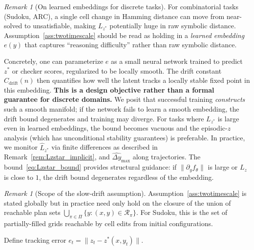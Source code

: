 \documentclass{article}
\theoremstyle{plain}
\theoremstyle{definition}
\theoremstyle{remark}
\newtheorem{remark}[theorem]{Remark}
\newcommand{\Cdrift}{C_{\mathrm{drift}}}
\begin{document}
\begin{remark}[On learned embeddings for discrete tasks]
\label{rem:reasoning_manifold}
For combinatorial tasks (Sudoku, ARC), a single cell change in Hamming distance can move from near-solved to unsatisfiable, making $L_{z^*}$ potentially huge in raw symbolic distance.
Assumption~\ref{ass:twotimescale} should be read as holding in a \emph{learned embedding} $e(y)$ that captures ``reasoning difficulty'' rather than raw symbolic distance.

Concretely, one can parameterize $e$ as a small neural network trained to predict $z^*$ or checker scores, regularized to be locally smooth.
The drift constant $\Cdrift(n)$ then quantifies how well the latent tracks a locally stable fixed point in this embedding.
\textbf{This is a design objective rather than a formal guarantee for discrete domains.}
We posit that successful training \emph{constructs} such a smooth manifold; if the network fails to learn a smooth embedding, the drift bound degenerates and training may diverge.
For tasks where $L_{z^*}$ is large even in learned embeddings, the bound becomes vacuous and the episodic-$z$ analysis (which has unconditional stability guarantees) is preferable.
In practice, we monitor $\hat L_{z^*}$ via finite differences as described in Remark~\ref{rem:Lzstar_implicit}, and $\widehat{\Delta y}_{\max}$ along trajectories.
The bound~\eqref{eq:Lzstar_bound} provides structural guidance: if $\|\partial_y f_\theta\|$ is large or $L_z$ is close to $1$, the drift bound degenerates regardless of the embedding.
\end{remark}

\begin{remark}[Scope of the slow-drift assumption]
\label{rem:slowdrift_scope}
Assumption~\ref{ass:twotimescale} is stated globally but in practice need only hold on the closure of the union of reachable plan sets $\bigcup_{\pi \in \Pi} \{y : (x,y) \in \mathcal{R}_\pi\}$.
For Sudoku, this is the set of partially-filled grids reachable by cell edits from initial configurations.
\end{remark}

Define tracking error $e_t = \bigl\|z_t - z^*(x,y_t)\bigr\|$.
\end{document}
